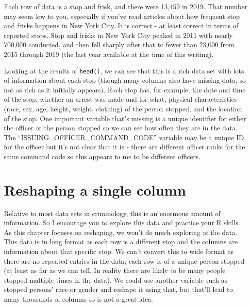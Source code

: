 \documentclass[
]{krantz}
\begin{document}
Each row of data is a stop and frisk, and there were 13,459 in 2019. That number may seem low to you, especially if you've read articles about how frequent stop and frisks happens in New York City. It is correct - at least correct in terms of reported stops. Stop and frisks in New York City peaked in 2011 with nearly 700,000 conducted, and then fell sharply after that to fewer than 23,000 from 2015 through 2019 (the last year available at the time of this writing).

Looking at the results of \texttt{head()}, we can see that this is a rich data set with lots of information about each stop (though many columns also have missing data, so not as rich as it initially appears). Each stop has, for example, the date and time of the stop, whether an arrest was made and for what, physical characteristics (race, sex, age, height, weight, clothing) of the person stopped, and the location of the stop. One important variable that's missing is a unique identifier for either the officer or the person stopped so we can see how often they are in the data. The ``ISSUING\_OFFICER\_COMMAND\_CODE'' variable may be a unique ID for the officer but it's not clear that it is - there are different officer ranks for the same command code so this appears to me to be different officers.

\hypertarget{reshaping-a-single-column}{%
\section{Reshaping a single column}\label{reshaping-a-single-column}}

Relative to most data sets in criminology, this is an enormous amount of information. So I encourage you to explore this data and practice your R skills. As this chapter focuses on reshaping, we won't do much exploring of the data. This data is in long format as each row is a different stop and the columns are information about that specific stop. We can't convert this to wide format as there are no repeated entries in the data; each row is of a unique person stopped (at least as far as we can tell. In reality there are likely to be many people stopped multiple times in the data). We could use another variable such as stopped persons' race or gender and reshape it using that, but that'll lead to many thousands of columns so is not a great idea.
\end{document}

